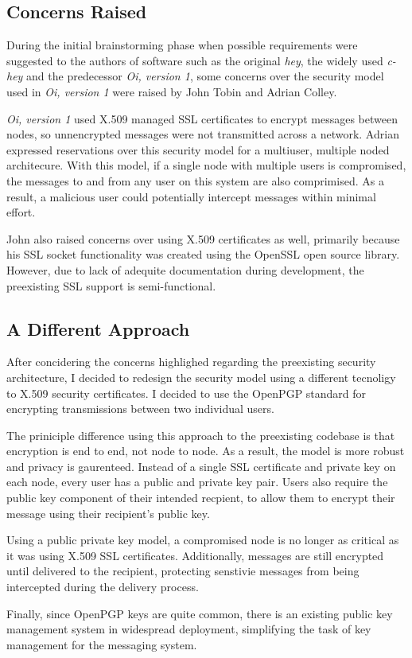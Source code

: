 
\subsection{Concerns Raised}

During the initial brainstorming phase when possible requirements were
suggested to the authors of software such as the original \emph{hey},
the widely used \emph{c-hey} and the predecessor \emph{Oi, version 1},
some concerns over the security model used in \emph{Oi, version 1} were
raised by John Tobin and Adrian Colley. 


\emph{Oi, version 1} used X.509 managed SSL certificates to encrypt 
messages between nodes, so unnencrypted messages were not transmitted 
across a network. Adrian expressed reservations over this security model 
for a multiuser, multiple noded architecure. With this model, if a
single node with multiple users is compromised, the messages to and from
any user on this system are also comprimised. As a result, a malicious
user could potentially intercept messages within minimal effort.


John also raised concerns over using X.509 certificates as well,
primarily because his SSL socket functionality was created using the
OpenSSL open source library. However, due to lack of adequite
documentation during development, the preexisting SSL support is
semi-functional.

\subsection{A Different Approach}

After concidering the concerns highlighed regarding the preexisting
security architecture, I decided to redesign the security model using a
different tecnoligy to X.509 security certificates. I decided to use the 
OpenPGP standard for encrypting transmissions between two individual 
users.


The priniciple difference using this approach to the preexisting
codebase is that encryption is end to end, not node to node. As a
result, the model is more robust and privacy is gaurenteed. Instead of a
single SSL certificate and private key on each node, every user has a
public and private key pair. Users also require the public key component
of their intended recpient, to allow them to encrypt their message using
their recipient's public key.


Using a public private key model, a compromised node is no longer as
critical as it was using X.509 SSL certificates. Additionally, messages
are still encrypted until delivered to the recipient, protecting
senstivie messages from being intercepted during the delivery process.


Finally, since OpenPGP keys are quite common, there is an existing
public key management system in widespread deployment, simplifying the
task of key management for the messaging system.
